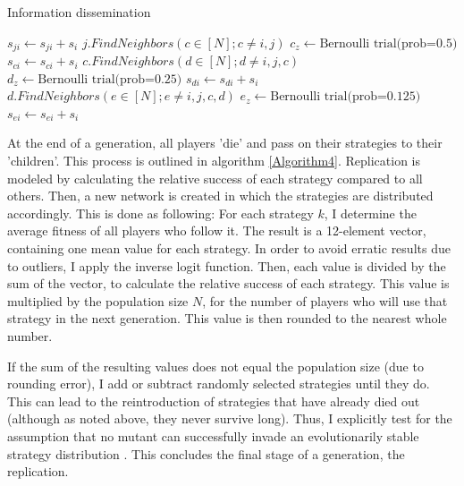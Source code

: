 \documentclass[12pt]{article}
\begin{document}
\begin{algorithm}
	\caption{Information dissemination}
	\label{Algorithm3}
	\begin{algorithmic}
		\State $s_{ji} \gets s_{ji}+s_{i}$
		\State $j.FindNeighbors(c\in[N];c\neq i,j)$
		\State $c_z \gets \text{Bernoulli trial(prob=0.5)}$
		\State $s_{ci} \gets s_{ci}+s_{i}$
		\State $c.FindNeighbors(d\in[N];d\neq i,j,c)$
		\State $d_z \gets \text{Bernoulli trial(prob=0.25)}$
		\State $s_{di} \gets s_{di}+s_{i}$
		\State $d.FindNeighbors(e\in[N];e\neq i,j,c,d)$
		\State $e_z \gets \text{Bernoulli trial(prob=0.125)}$
		\State $s_{ei} \gets s_{ei}+s_{i}$
		\EndIf
		\EndFor
		\EndIf
		\EndFor
		\EndIf
		\EndFor
		\EndFor
		\EndFunction
	\end{algorithmic}
\end{algorithm}

At the end of a generation, all players 'die' and pass on their strategies to their 'children'. This process is outlined in algorithm \ref{Algorithm4}. Replication is modeled by calculating the relative success of each strategy compared to all others. Then, a new network is created in which the strategies are distributed accordingly. This is done as following: For each strategy $k$, I determine the average fitness of all players who follow it. The result is a 12-element vector, containing one mean value for each strategy. In order to avoid erratic results due to outliers, I apply the inverse logit function. Then, each value is divided by the sum of the vector, to calculate the relative success of each strategy. This value is multiplied by the population size $N$, for the number of players who will use that strategy in the next generation. This value is then rounded to the nearest whole number.

If the sum of the resulting values does not equal the population size (due to rounding error), I add or subtract randomly selected strategies until they do. This can lead to the reintroduction of strategies that have already died out (although as noted above, they never survive long). Thus, I explicitly test for the assumption that no mutant can successfully invade an evolutionarily stable strategy distribution \citep{hamilton1964_2}. This concludes the final stage of a generation, the replication.
\end{document}
